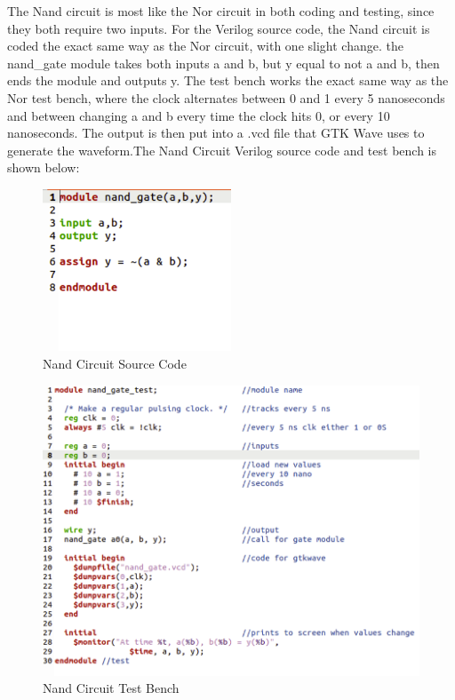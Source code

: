 \documentclass[runningheads, 12pt]{report}
\begin{document}
\clearpage
	The Nand circuit is most like the Nor circuit in both coding and testing, since they both require two inputs. For the Verilog source code, the Nand circuit is coded the exact same way as the Nor circuit, with one slight change. the nand\_gate module takes both inputs a and b, but y equal to not a and b, then ends the module and outputs y. The test bench works the exact same way as the Nor test bench, where the clock alternates between 0 and 1 every 5 nanoseconds and between changing a and b every time the clock hits 0, or every 10 nanoseconds. The output is then put into a .vcd file that GTK Wave uses to generate the waveform.The Nand Circuit Verilog source code and test bench is shown below:
	
\begin{figure}[h]
	\centering
	\includegraphics[width=0.5\textwidth]{nand_gate_sc}
	\caption{Nand Circuit Source Code}
	\label{fig: nand_gate_sc}
\end{figure}

\begin{figure}[h]
	\centering
	\includegraphics[width=1.0\textwidth]{nand_gate_test}
	\caption{Nand Circuit Test Bench}
	\label{fig: nand_gate_test}
\end{figure}
	
\end{document}
